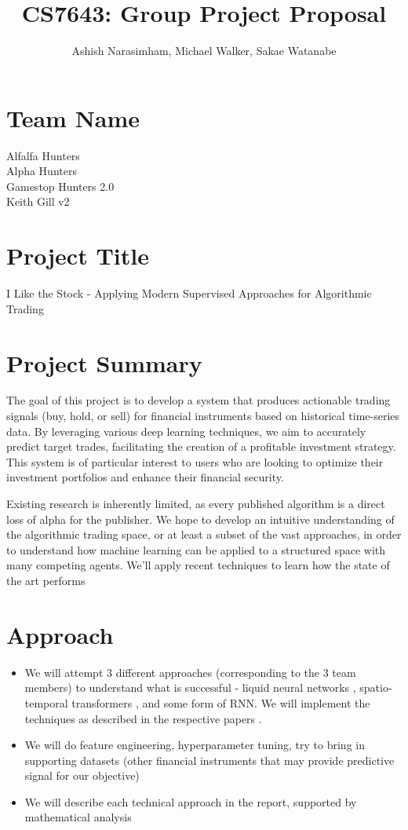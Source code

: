 \documentclass[
	letterpaper, %
]{jdf}
\author{Ashish Narasimham, Michael Walker, Sakae Watanabe}
\title{CS7643: Group Project Proposal}
\begin{document}
\maketitle

\section*{Team Name}

Alfalfa Hunters \\
Alpha Hunters \\
Gamestop Hunters 2.0 \\
Keith Gill v2 \\

\section*{Project Title}

I Like the Stock - Applying Modern Supervised Approaches for Algorithmic Trading

\section*{Project Summary}
The goal of this project is to develop a system that produces actionable trading signals (buy, hold, or sell) for financial instruments based on historical time-series data. By leveraging various deep learning techniques, we aim to accurately predict target trades, facilitating the creation of a profitable investment strategy. This system is of particular interest to users who are looking to optimize their investment portfolios and enhance their financial security.

Existing research is inherently limited, as every published algorithm is a direct loss of alpha for the publisher. We hope to develop an intuitive understanding of the algorithmic trading space, or at least a subset of the vast approaches, in order to understand how machine learning can be applied to a structured space with many competing agents. We’ll apply recent techniques to learn how the state of the art performs


\section*{Approach}

\begin{itemize}
    \item We will attempt 3 different approaches (corresponding to the 3 team members) to understand what is successful - liquid neural networks \cite{hasani_liquid_2020}, spatio-temporal transformers \cite{boyle_spatiotemporal_2023}, and some form of RNN. We will implement the techniques as described in the respective papers \citep{kazemi_time2vec_2019,su_self-attentive_2022}.
    \item We will do feature engineering, hyperparameter tuning, try to bring in supporting datasets (other financial instruments that may provide predictive signal for our objective)
    \item We will describe each technical approach in the report, supported by mathematical analysis
\end{itemize}
\end{document}
